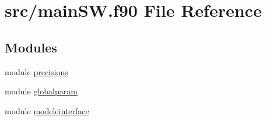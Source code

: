\hypertarget{mainSW_8f90}{}\section{src/main\+SW.f90 File Reference}
\label{mainSW_8f90}
\subsection*{Modules}
\begin{DoxyCompactItemize}
\item 
module \mbox{\hyperlink{namespaceprecisions}{precisions}}
\item 
module \mbox{\hyperlink{namespaceglobalparam}{globalparam}}
\item 
module \mbox{\hyperlink{namespacemodeleinterface}{modeleinterface}}
\end{DoxyCompactItemize}
